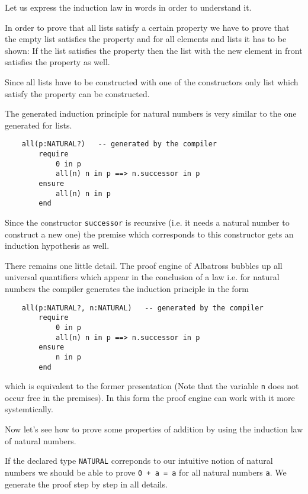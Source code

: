 Let us express the induction law in words in order to understand it.

In order to prove that all lists satisfy a certain property we have to prove
that the empty list satisfies the property and for all elements and lists it
has to be shown: If the list satisfies the property then the list with the new
element in front satisfies the property as well.

Since all lists have to be constructed with one of the constructors only list
which satisfy the property can be constructed.

The generated induction principle for natural numbers is very similar to the
one generated for lists.

\begin{lstlisting}
    all(p:NATURAL?)   -- generated by the compiler
        require
            0 in p
            all(n) n in p ==> n.successor in p
        ensure
            all(n) n in p
        end  
\end{lstlisting}
Since the constructor \lstinline!successor! is recursive (i.e. it needs a
natural number to construct a new one) the premise which corresponds to this
constructor gets an induction hypothesis as well.

There remains one little detail. The proof engine of Albatross bubbles up all
universal quantifiers which appear in the conclusion of a law i.e. for natural
numbers the compiler generates the induction principle in the form
\begin{lstlisting}
    all(p:NATURAL?, n:NATURAL)   -- generated by the compiler
        require
            0 in p
            all(n) n in p ==> n.successor in p
        ensure
            n in p
        end  
\end{lstlisting}
which is equivalent to the former presentation (Note that the variable
\lstinline!n! does not occur free in the premises). In this form the proof
engine can work with it more systemtically.


Now let's see how to prove some properties of addition by using the induction
law of natural numbers.

If the declared type \lstinline!NATURAL! correponds to our intuitive notion of
natural numbers we should be able to prove \lstinline!0 + a = a! for all
natural numbers \lstinline!a!. We generate the proof step by step in all
details.

